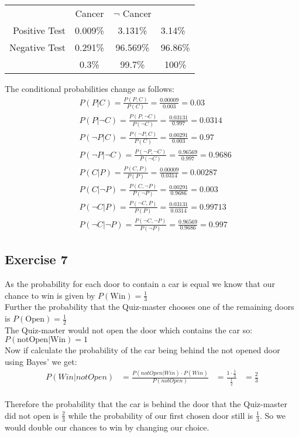 \begin{tabular}{ r|c|c|l }
\multicolumn{1}{r}{}
 &  \multicolumn{1}{c}{Cancer}
 & \multicolumn{1}{c}{$\neg$ Cancer} \\
\cline{2-3}
Positive Test & 0.009\% & 3.131\% & 3.14\%\\ 
\cline{2-3}
Negative Test & 0.291\% & 96.569\% & 96.86\% \\
\cline{2-3}
\multicolumn{1}{r}{}
 &  \multicolumn{1}{c}{0.3\%}
 & \multicolumn{1}{c}{99.7\%}  & \multicolumn{1}{c}{100\%}\\
\end{tabular}
\newpage
The conditional probabilities change as follows:
\begin{align*}
& P(P|C) = \frac{P(P,C)}{P(C)} = \frac{0.00009}{0.003} = 0.03 \\
& P(P|\neg C) = \frac{P(P,\neg C)}{P(\neg C)} = \frac{0.03131}{0.997} = 0.0314 \\
& P(\neg P|C) = \frac{P(\neg P,C)}{P(C)} = \frac{0.00291}{0.003} = 0.97 \\
& P(\neg P|\neg C) = \frac{P(\neg P,\neg C)}{P(\neg C)} = \frac{0.96569}{0.997}= 0.9686\\
& P(C|P) = \frac{P(C,P)}{P(P)} = \frac{0.00009}{0.0314} = 0.00287 \\
& P(C|\neg P) = \frac{P(C,\neg P)}{P(\neg P)} = \frac{0.00291}{0.9686} = 0.003 \\
& P(\neg C|P) = \frac{P(\neg C,P)}{P(P)} = \frac{0.03131}{0.0314} = 0.99713 \\
& P(\neg C|\neg P) = \frac{P(\neg C,\neg P)}{P(\neg P)} = \frac{0.96569}{0.9686}= 0.997 
\end{align*}

\subsection*{Exercise 7}

As the probability for each door to contain a car is equal we know that our chance to win is given by $P(\mbox{Win}) = \frac{1} 3$\\
Further the probability that the Quiz-master chooses one of the remaining doors is
$P(\mbox{Open}) = \frac{1} 2$\\
The Quiz-master would not open the door which contains the car so: \\
$P(\mbox{notOpen}|\mbox{Win}) = 1$\\
Now if calculate the probability of the car being behind the not opened door using Bayes' we get:
\begin{align*}
& & P(Win|notOpen) & = \frac{P(notOpen|Win) \cdot P(Win)}{P(notOpen)} & = \frac{1 \cdot \frac{1}{3}}{\frac{1}{2}} &= \frac{2}{3}& &
\end{align*}
\\
Therefore the probability that the car is behind the door that the Quiz-master did not open is $\frac{2}{3}$ while the probability of our first chosen door still is $\frac{1}{3}$. So we would double our chances to win by changing our choice.